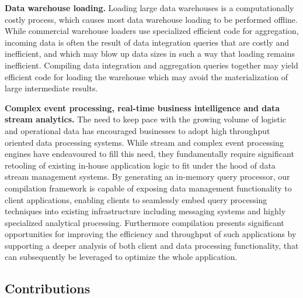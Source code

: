 \textbf{Data warehouse loading.}
Loading large data warehouses is a computationally costly process, which
causes most data warehouse loading to be performed offline.
While commercial warehouse loaders use specialized efficient code for 
aggregation, incoming data is often the result of data integration
queries that are costly and inefficient, and which may blow up data sizes
in such a way that loading remains inefficient.
Compiling data integration and aggregation queries together may yield efficient
code for loading the warehouse which may avoid the materialization of large
intermediate results.


\textbf{Complex event processing, real-time business
intelligence and data stream analytics.}
The need to keep pace with the growing volume of logistic and operational data
has encouraged businesses to adopt high throughput oriented data processing
systems. While stream and complex event processing engines have endeavoured to
fill this need, they fundamentally require significant retooling of existing
in-house application logic to fit under the hood of data stream management
systems. By generating an in-memory query processor, our compilation framework is
capable of exposing data management functionality to client applications,
enabling clients to seamlessly embed query processing techniques into existing
infrastructure including messaging systems and highly specialized analytical
processing. Furthermore compilation presents significant opportunities for
improving the efficiency and throughput of such applications by supporting a
deeper analysis of both client and data processing functionality, that can
subsequently be leveraged to optimize the whole application.

\medskip






\subsection{Contributions}




